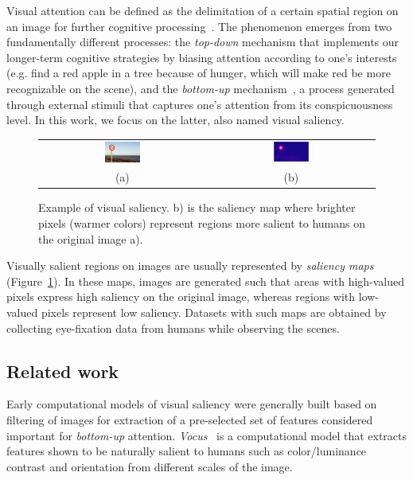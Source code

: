 \documentclass[10pt,twocolumn,letterpaper]{article}
\begin{document}
Visual attention can be defined as the delimitation of a certain spatial
region on an image for further cognitive processing~\cite{treisman_1980}.
The phenomenon emerges from two fundamentally different processes:
the \emph{top-down} mechanism that implements our longer-term cognitive
strategies by biasing attention according to one's interests
(e.g. find a red apple in a tree because of hunger,
which will make red be more recognizable on the scene),
and the \emph{bottom-up} mechanism~\cite{colombini_2016},
a process generated through external stimuli
that captures one's attention from its conspicuousness level.
In this work, we focus on the latter, also named visual saliency.

\begin{center}
\begin{figure}[t]
\begin{tabular} {cc}
\includegraphics[width=0.22\textwidth]{./img/traffic_sign_s.jpg} &
\includegraphics[width=0.22\textwidth]{./img/traffic_sign_m.jpg}\\
(a) & (b)
\end{tabular}
\caption{Example of visual saliency.
    b) is the saliency map where brighter pixels (warmer colors)
    represent regions more salient to humans on the original image a).}
\label{fig:example}
\end{figure}
\end{center}

Visually salient regions on images are usually represented by
\emph{saliency maps} (Figure~\ref{fig:example}). In these maps, images are generated such that
areas with high-valued pixels express high saliency on the original image,
whereas regions with low-valued pixels represent low saliency.
Datasets with such maps are obtained by collecting eye-fixation
data from humans while observing the scenes.

\subsection{Related work}
Early computational models of visual saliency were generally built based on
filtering of images for extraction of a pre-selected set of features
considered important for \emph{bottom-up} attention.
\emph{Vocus}~\cite{frintrop_2005} is a computational model that extracts
features shown to be naturally salient to humans such as color/luminance
contrast and orientation from different scales of the image.
\end{document}
